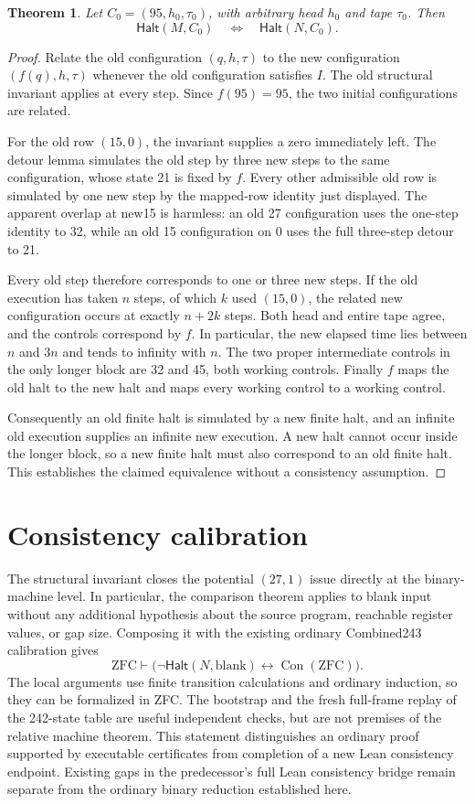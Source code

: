 \documentclass[11pt]{article}
\newtheorem{theorem}{Theorem}
\newcommand{\Halt}{\mathsf{Halt}}
\begin{document}
\begin{theorem}
Let $C_0=(95,h_0,\tau_0)$, with arbitrary head $h_0$ and tape $\tau_0$.
Then
\[
 \Halt(M,C_0)\quad\Longleftrightarrow\quad\Halt(N,C_0).
\]
\end{theorem}
\begin{proof}
Relate the old configuration $(q,h,\tau)$ to the new configuration
$(f(q),h,\tau)$ whenever the old configuration satisfies $I$.
The old structural invariant applies at every step. Since $f(95)=95$,
the two initial configurations are related.

For the old row $(15,0)$, the invariant supplies a zero immediately
left. The detour lemma simulates the old step by three new steps to the
same configuration, whose state 21 is fixed by $f$. Every other
admissible old row is simulated by one new step by the mapped-row
identity just displayed. The apparent overlap at new15 is harmless:
an old 27 configuration uses the one-step identity to 32, while an old 15
configuration on 0 uses the full three-step detour to 21.

Every old step therefore corresponds to one or three new steps. If the
old execution has taken $n$ steps, of which $k$ used $(15,0)$, the related
new configuration occurs at exactly $n+2k$ steps. Both head and entire
tape agree, and the controls correspond by $f$. In particular, the
new elapsed time lies between $n$ and $3n$ and tends to infinity with
$n$. The two proper intermediate controls in the only longer block are 32
and 45, both working controls. Finally $f$ maps the old halt to the new
halt and maps every working control to a working control.

Consequently an old finite halt is simulated by a new finite halt, and
an infinite old execution supplies an infinite new execution. A new
halt cannot occur inside the longer block, so a new finite halt must
also correspond to an old finite halt. This establishes the claimed
equivalence without a consistency assumption.
\end{proof}

\section{Consistency calibration}

The structural invariant closes the potential $(27,1)$ issue directly
at the binary-machine level. In particular, the comparison theorem
applies to blank input without any additional hypothesis about the
source program, reachable register values, or gap size. Composing it
with the existing ordinary Combined243 calibration gives
\[
 \mathrm{ZFC}\vdash
 \bigl(\neg\Halt(N,\mathrm{blank})\leftrightarrow
       \operatorname{Con}(\mathrm{ZFC})\bigr).
\]
The local arguments use finite transition calculations and ordinary
induction, so they can be formalized in ZFC. The bootstrap and the fresh
full-frame replay of the 242-state table are useful independent checks,
but are not premises of the relative machine theorem. This statement
distinguishes an ordinary proof supported by executable certificates
from completion of a new Lean consistency endpoint. Existing gaps in
the predecessor's full Lean consistency bridge remain separate from
the ordinary binary reduction established here.
\end{document}
